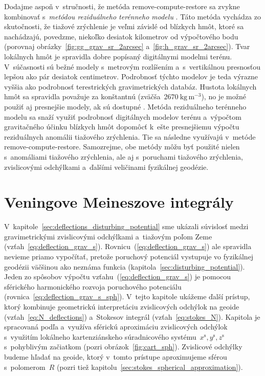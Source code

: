 \documentclass[a4paper, 12pt]{book}
\begin{document}
Dodajme aspoň v~stručnosti, že metóda remove-compute-restore sa zvykne 
kombinovať s~\emph{metódou reziduálneho terénneho modelu} 
\parencite{Forsberg1981,Forsberg1984}.  Táto metóda vychádza zo skutočnosti, že 
tiažové zrýchlenie je veľmi závislé od blízkych hmôt, ktoré sa nachádzajú, 
povedzme, niekoľko desiatok kilometrov od výpočtového bodu (porovnaj 
obrázky~\ref{fig:gg_grav_sr_2arcsec} a~\ref{fig:h_grav_sr_2arcsec}).  Tvar 
lokálnych hmôt je spravidla dobre popísaný digitálnymi modelmi terénu.  
V~súčasnosti sú bežné modely s~metrovým rozlíšením a~s~vertikálnou presnosťou 
lepšou ako pár desiatok centimetrov.  Podrobnosť týchto modelov je teda výrazne 
vyššia ako podrobnosť terestrických gravimetrických databáz.  Hustota lokálnych 
hmôt sa spravidla považuje za konštantnú (zväčša~$2670\ \mathrm{kg}\, 
\mathrm{m}^{-3}$), no je možné použiť aj presnejšie modely, ak sú dostupné 
\parencite[napríklad][]{Yang2018}.  Metóda reziduálneho terénneho modelu sa 
snaží využiť podrobnosť digitálnych modelov terénu a~výpočtom gravitačného 
účinku blízkych hmôt dopomôcť k~ešte presnejšiemu výpočtu reziduálnych anomálii 
tiažového zrýchlenia.  Tie sa následne využívajú v~metóde 
remove-compute-restore.  Samozrejme, obe metódy môžu byť použité nielen 
s~anomáliami tiažového zrýchlenia, ale aj s~poruchami tiažového zrýchlenia, 
zvislicovými odchýlkami a~ďalšími veličinami fyzikálnej geodézie.




\section{Veningove Meineszove integrály}
\label{sec:vm_integral}

V~kapitole~\ref{sec:deflections_disturbing_potential} sme ukázali súvislosť 
medzi gravimetrickými zvislicovými odchýlkami a~tiažovým poľom Zeme 
(vzťah~\ref{eq:deflection_grav_s}).  Rovnicu~(\ref{eq:deflection_grav_s}) ale 
spravidla nevieme priamo vypočítať, pretože poruchový potenciál vystupuje vo 
fyzikálnej geodézii väčšinou ako neznáma funkcia 
(kapitola~\ref{sec:disturbing_potential}).  Jeden zo spôsobov výpočtu 
vzťahu~(\ref{eq:deflection_grav_s}) je pomocou sférického harmonického rozvoja 
poruchového potenciálu (rovnica~\ref{eq:deflection_grav_s_sph}).  V~tejto 
kapitole ukážeme ďalší prístup, ktorý kombinuje geometrickú interpretáciu 
zvislicových odchýlok na geoide (vzťah~\ref{eq:N_deflections}) a~Stokesov 
integrál (vzťah~\ref{eq:stokes_N}).  Kapitola je spracovaná podľa 
\textcite{MoritzPhysicalGeodesy} a~využíva sférickú aproximáciu zvislicových 
odchýlok s~využitím lokálneho kartenziánskeho súradnicového 
systému~$x^\mathrm{s}, y^\mathrm{s}, z^\mathrm{s}$ s~pohyblivým začiatkom 
(pozri obrázok~\ref{fig:cart_sph}).  Zvislicové odchýlky budeme hľadať na 
geoide, ktorý v~tomto prístupe aproximujeme sférou s~polomerom~$R$ (pozri tiež 
kapitolu~\ref{sec:stokes_spherical_approximation}).
\end{document}
